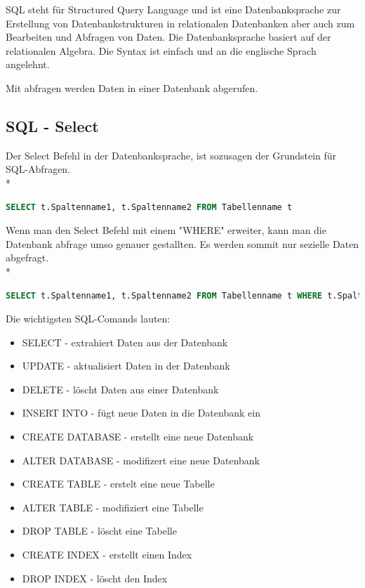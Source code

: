 SQL steht für Structured Query Language und ist eine Datenbanksprache zur Erstellung von Datenbankstrukturen in relationalen Datenbanken 
aber auch zum Bearbeiten und Abfragen von Daten. Die Datenbanksprache basiert auf der relationalen Algebra. Die Syntax ist einfach und an die englische Sprach angelehnt. 

Mit abfragen werden Daten in einer Datenbank abgerufen. \cite{SQL}

\subsection{SQL - Select}

Der Select Befehl in der Datenbanksprache, ist sozusagen der Grundstein für SQL-Abfragen.  \\*

\begin{lstlisting}[language=SQL,caption=Sql Select,label=lst:impl:foo]
SELECT t.Spaltenname1, t.Spaltenname2 FROM Tabellenname t
\end{lstlisting}

Wenn man den Select Befehl mit einem "WHERE" erweiter, kann man die Datenbank abfrage umso genauer gestallten. Es werden sommit nur sezielle Daten abgefragt. \\*

\begin{lstlisting}[language=SQL,caption=Sql Select Where,label=lst:impl:foo]
SELECT t.Spaltenname1, t.Spaltenname2 FROM Tabellenname t WHERE t.Spaltenname1 = 1
\end{lstlisting}


Die wichtigsten SQL-Comands lauten:
\begin{itemize}
  \item SELECT - extrahiert Daten aus der Datenbank
  \item UPDATE - aktualisiert Daten in der Datenbank
  \item DELETE - löscht Daten aus einer Datenbank
  \item INSERT INTO - fügt neue Daten in die Datenbank ein
  \item CREATE DATABASE - erstellt eine neue Datenbank
  \item ALTER DATABASE - modifizert eine neue Datenbank
  \item CREATE TABLE - erstelt eine neue Tabelle
  \item ALTER TABLE - modifiziert eine Tabelle
  \item DROP TABLE - löscht eine Tabelle
  \item CREATE INDEX - erstellt einen Index
  \item DROP INDEX - löscht den Index
\end{itemize}

